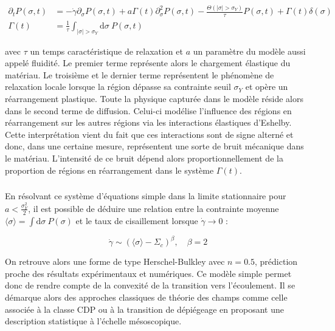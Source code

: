 \begin{equation}
\begin{aligned}
	\partial_t P(\sigma, t) &= -\dot{\gamma}\partial_\sigma P(\sigma, t) + a\Gamma(t)\partial_\sigma^2P(\sigma, t) - \frac{\Theta (|\sigma|>\sigma_Y)}{\tau}P(\sigma, t) + \Gamma(t)\delta(\sigma)\\
	\Gamma(t) &= \frac{1}{\tau}\int_{|\sigma|>\sigma_Y}\mathrm{d}\sigma ~ P(\sigma, t)
\end{aligned}
\end{equation}

\noindent avec $\tau$ un temps caractéristique de relaxation et $a$ un paramètre du modèle aussi appelé fluidité. Le premier terme représente alors le chargement élastique du matériau. Le troisième et le dernier terme représentent le phénomène de relaxation locale lorsque la région dépasse sa contrainte seuil $\sigma_Y$ et opère un réarrangement plastique. Toute la physique capturée dans le modèle réside alors dans le second terme de diffusion. Celui-ci modélise l'influence des régions en réarrangement sur les autres régions via les interactions élastiques d'Eshelby. Cette interprétation vient du fait que ces interactions sont de signe alterné et donc, dans une certaine mesure, représentent une sorte de bruit mécanique dans le matériau. L'intensité de ce bruit dépend alors proportionnellement de la proportion de régions en réarrangement dans le système $\Gamma (t)$.

\subparagraph{}En résolvant ce système d'équations simple dans la limite stationnaire pour $a < \frac{\sigma_Y^2}{2}$, il est possible de déduire une relation entre la contrainte moyenne $\langle \sigma \rangle =  \int \mathrm{d}\sigma ~ P(\sigma)$ et le taux de cisaillement lorsque $\dot{\gamma}\rightarrow 0$ \cite{olivier_fluides_2011, bertin_stochastic_2022} :

\begin{equation}
	\dot{\gamma} \sim (\langle \sigma \rangle - \Sigma_c)^\beta, \quad \beta = 2
\end{equation}

\noindent On retrouve alors une forme de type Herschel-Bulkley avec $n=0.5$, prédiction proche des résultats expérimentaux et numériques. Ce modèle simple permet donc de rendre compte de la convexité de la transition vers l'écoulement. Il se démarque alors des approches classiques de théorie des champs comme celle associée à la classe CDP ou à la transition de dépiégeage en proposant une description statistique à l'échelle mésoscopique. 

